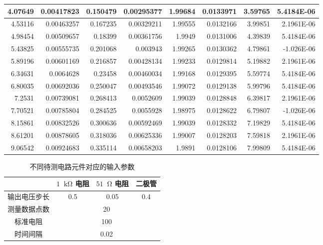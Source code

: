 \documentclass[11pt]{article}
\newcommand*{\unit}[1]{\mathop{}\!\mathrm{#1}}
\begin{document}
\begin{enumerate}
\begin{table}[H]
\begin{tabular}{|r|r|r|r|r|r|r|r|}
        4.07649 & 0.00417823 & 0.150479 & 0.00295377 & 1.99684 & 0.0133971 & 3.59765 & 5.4184E-06 \bigstrut\\
        \hline
        4.53116 & 0.00463257 & 0.167235 & 0.00329211 & 1.99555 & 0.0132166 & 3.99851 & 2.1961E-06 \bigstrut\\
        \hline
        4.98454 & 0.00509657 & 0.18399 & 0.00361756 & 1.9949 & 0.0131006 & 4.39839 & 5.4184E-06 \bigstrut\\
        \hline
        5.43825 & 0.00555735 & 0.201068 & 0.003943 & 1.99265 & 0.0130362 & 4.79861 & -1.026E-06 \bigstrut\\
        \hline
        5.89196 & 0.00601169 & 0.216857 & 0.00428134 & 1.99233 & 0.0129814 & 5.19882 & 2.1961E-06 \bigstrut\\
        \hline
        6.34631 & 0.0064628 & 0.23458 & 0.00460034 & 1.99168 & 0.0129395 & 5.59774 & 5.4184E-06 \bigstrut\\
        \hline
        6.80035 & 0.00692036 & 0.250047 & 0.00493546 & 1.99072 & 0.0129138 & 5.99796 & 5.4184E-06 \bigstrut\\
        \hline
        7.2531 & 0.00739081 & 0.268413 & 0.0052609 & 1.99039 & 0.0128848 & 6.39817 & 2.1961E-06 \bigstrut\\
        \hline
        7.70521 & 0.00785804 & 0.284525 & 0.0055928 & 1.98975 & 0.0128622 & 6.79807 & -1.026E-06 \bigstrut\\
        \hline
        8.15861 & 0.00832526 & 0.300636 & 0.00592469 & 1.99039 & 0.0128332 & 7.19829 & 5.4184E-06 \bigstrut\\
        \hline
        8.61201 & 0.00878605 & 0.318036 & 0.00625336 & 1.99007 & 0.0128203 & 7.59818 & 2.1961E-06 \bigstrut\\
        \hline
        9.06542 & 0.00924683 & 0.335114 & 0.00658203 & 1.9891 & 0.0128106 & 7.99809 & 5.4184E-06 \bigstrut\\
        \hline
      \end{tabular}
\end{table}


\begin{table}[H]
    \centering
    \caption{不同待测电路元件对应的输入参数}
    \begin{tabular}{|c|c|c|c|}
        \hline
          & $1 \unit{k\Omega}$ 电阻  & $51 \unit{\Omega}$ 电阻  & 二极管 \bigstrut\\
        \hline
        输出电压步长 & 0.5    & 0.05   & 0.4 \bigstrut\\
        \hline
        测量数据点数 & \multicolumn{3}{c|}{20} \bigstrut\\
        \hline
        标准电阻   & \multicolumn{3}{c|}{100} \bigstrut\\
        \hline
        时间间隔   & \multicolumn{3}{c|}{0.02} \bigstrut\\
        \hline
    \end{tabular}
\end{table}



\end{enumerate}
\end{document}
